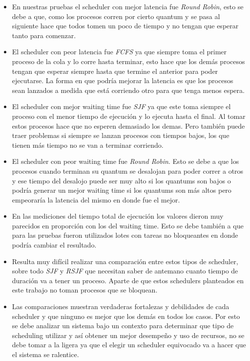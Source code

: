 \begin{itemize}

\item En nuestras pruebas el scheduler con mejor latencia fue \emph{Round Robin}, esto se debe a que, como los procesos corren por cierto quantum y se pasa al siguiente hace que todos tomen un poco de tiempo y no tengan que esperar tanto para comenzar.

\item El scheduler con peor latencia fue \emph{FCFS} ya que siempre toma el primer proceso de la cola y lo corre hasta terminar, esto hace que los demás procesos tengan que esperar siempre hasta que termine el anterior para poder ejecutarse. La forma en que podría mejorar la latencia es que los procesos sean lanzados a medida que está corriendo otro para que tenga menos espera.

\item El scheduler con mejor waiting time fue \emph{SJF} ya que este toma siempre el proceso con el menor tiempo de ejecución y lo ejecuta hasta el final. Al tomar estos procesos hace que no esperen demasiado los demas. Pero también puede traer problemas si siempre se lanzan procesos con tiempos bajos, los que tienen más tiempo no se van a terminar corriendo.

\item El scheduler con peor waiting time fue \emph{Round Robin}. Esto se debe a que los procesos cuando terminan su quantum se desalojan para poder correr a otros y ese tiempo del desalojo puede ser muy alto si los quantums son bajos o podría generar un mejor waiting time si los quantums son más altos pero empeoraría la latencia del mismo en donde fue el mejor.

\item En las mediciones del tiempo total de ejecución los valores dieron muy parecidos en proporción con los del waiting time. Esto se debe también a que para las pruebas fueron utilizados lotes con tareas no bloqueantes en donde podría cambiar el resultado.

\item Resulta muy difícil realizar una comparación entre estos tipos de scheduler, sobre todo \emph{SJF} y \emph{RSJF} que necesitan saber de antemano cuanto tiempo de duración va a tener un proceso. Aparte de que estos schedulers planteados en este trabajo no toman procesos que se bloquean.

\item Las comparaciones muestran verdaderas fortalezas y debilidades de cada scheduler y que ninguno es mejor que los demás en todos los casos. Por esto se debe analizar un sistema bajo un contexto para determinar que tipo de scheduling utilizar y así obtener un mejor desempeño y uso de recursos, no se debe tomar a la ligera ya que el elegir un scheduler equivocado va a hacer que el sistema se ralentice.

\end{itemize}

